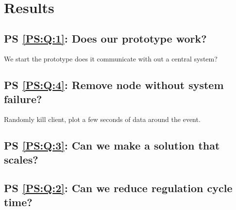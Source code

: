
\chapter{Results}

\section{PS \ref{PS:Q:1}: Does our prototype work?}
We start the prototype does it communicate with out a central system?


\section{PS \ref{PS:Q:4}: Remove node without system failure?}
Randomly kill client, plot a few seconds of data around the event.

\section{PS \ref{PS:Q:3}: Can we make a solution that scales?}




\section{PS \ref{PS:Q:2}: Can we reduce regulation cycle time?}



